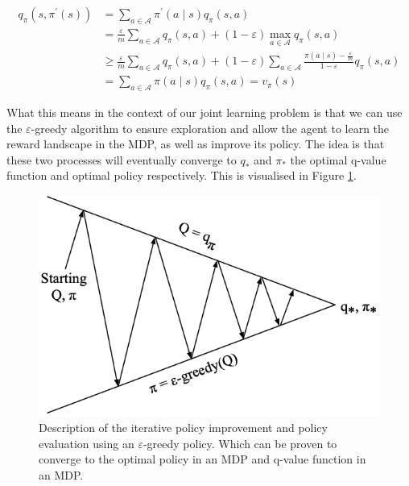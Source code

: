 \documentclass{article}
\begin{document}
\begin{equation}
\begin{aligned} 
    q_\pi\left(s, \pi^{\prime}(s)\right) 
    &= \sum_{a \in \mathcal{A}} \pi^{\prime}(a \mid s) q_\pi(s, a) \\
    &= \frac{\varepsilon}{m} \sum_{a \in \mathcal{A}} q_\pi(s, a) + (1 - \varepsilon) \max_{a \in \mathcal{A}} q_\pi(s, a) \\
    &\geq \frac{\varepsilon}{m} \sum_{a \in \mathcal{A}} q_\pi(s, a) 
        + (1 - \varepsilon) \sum_{a \in \mathcal{A}} \frac{\pi(a \mid s) - \frac{\varepsilon}{m}}{1 - \varepsilon} q_\pi(s, a) \\
    &= \sum_{a \in \mathcal{A}} \pi(a \mid s) q_\pi(s, a) = v_\pi(s)
\end{aligned}	
\end{equation}

What this means in the context of our joint learning problem is that we can use the $\varepsilon$-greedy algorithm to ensure exploration and allow the agent to learn the reward landscape in the MDP, as well as improve its policy. The idea is that these two processes will eventually converge to $q_*$ and $\pi_*$ the optimal q-value function and optimal policy respectively. This is visualised in Figure \ref{fig:eval_improvement}.

\begin{figure}
	\centering
	\includegraphics[scale=0.4]{images/eval_improve.png}
	\caption{ Description of the iterative policy improvement and policy evaluation using an $\varepsilon$-greedy policy.\citep{silver2015rl} Which can be proven to converge to the optimal policy in an MDP and q-value function in an MDP.}
	\label{fig:eval_improvement}
\end{figure}
\end{document}
